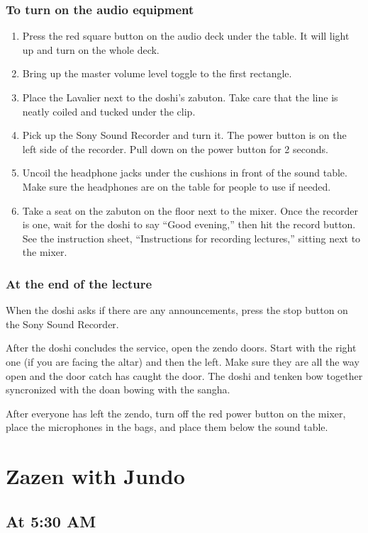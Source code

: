 \documentclass{chantbook}
\begin{document}
\subsection*{To turn on the audio equipment}
\begin{enumerate}
\item Press the red square button on the audio deck under the table. It will
light up and turn on the whole deck.
\item Bring up the master volume level toggle to the first rectangle.
\item Place the Lavalier next to the doshi's zabuton. Take care that the line
is neatly coiled and tucked under the clip.
\item Pick up the Sony Sound Recorder and turn it. The power button is on the
left side of the recorder. Pull down on the power button for 2 seconds.
\item Uncoil the headphone jacks under the cushions in front of the sound
table. Make sure the headphones are on the table for people to use if needed.
\item Take a seat on the zabuton on the floor next to the mixer. Once the
recorder is one, wait for the doshi to say ``Good evening,'' then hit the
record button. See the instruction sheet, ``Instructions for recording
lectures,'' sitting next to the mixer.
\end{enumerate}

\subsection*{At the end of the lecture}
When the doshi asks if there are any announcements, press the stop button on the
Sony Sound Recorder.

After the doshi concludes the service, open the zendo doors. Start with the
right one (if you are facing the altar) and then the left. Make sure they are
all the way open and the door catch has caught the door. The doshi and tenken
bow together syncronized with the doan bowing with the sangha.

After everyone has left the zendo, turn off the red power button on the mixer,
place the microphones in the bags, and place them below the sound table.

\fontsize{14pt}{16pt}\selectfont

\chapter{Zazen with Jundo}
\section*{At 5:30 AM}
\end{document}
